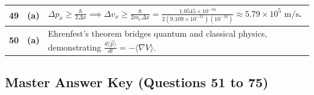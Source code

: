 {\begin{tabularx}{\textwidth}{|c|c|X|}
\textbf{49} & \textbf{(a)} & $\Delta p_x \ge \frac{\hbar}{2\Delta x} \implies \Delta v_x \ge \frac{\hbar}{2 m_e \Delta x} = \frac{1.0545 \times 10^{-34}}{2(9.109 \times 10^{-31})(10^{-10})} \approx 5.79 \times 10^5\text{ m/s}$. \\ \hline
\textbf{50} & \textbf{(a)} & Ehrenfest's theorem bridges quantum and classical physics, demonstrating $\frac{d\langle\vec{p}\rangle}{dt} = -\langle\nabla V\rangle$. \\ \hline
\end{tabularx}
}

\newpage

\subsection*{Master Answer Key (Questions 51 to 75)}

